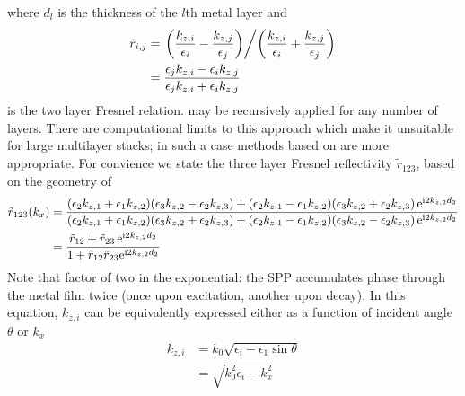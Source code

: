 \documentclass[a4paper,titlepage,onecolumn]{report}
\begin{document}
where $d_l$ is the thickness of the $l$th metal layer and 
\begin{align}
\tilde{r}_{i,j}&=
\left.\left(\frac{k_{z,i}}{\epsilon_i}-\frac{k_{z,j}}{\epsilon_j}\right)
\middle/
\left(\frac{k_{z,i}}{\epsilon_i}+\frac{k_{z,j}}{\epsilon_j}\right)\right.\\
&=\frac{\epsilon_j k_{z,i}-\epsilon_i k_{z,j}}
{\epsilon_j k_{z,i}+\epsilon_i k_{z,j}}
\end{align}
is the two layer Fresnel relation.   may be
recursively applied for any number of layers.  There are computational
limits to this approach which make it unsuitable for large multilayer
stacks; in such a case methods based on  are more
appropriate.  For convience we state the three layer Fresnel reflectivity
$\tilde{r}_{123}$, based on the geometry of 
\begin{align}
\tilde{r}_{123}(k_x) &=
\frac{
  (\epsilon_2 k_{z,1}+\epsilon_1 k_{z,2})(\epsilon_3 k_{z,2}-\epsilon_2 k_{z,3})
+ (\epsilon_2 k_{z,1}-\epsilon_1 k_{z,2})(\epsilon_3 k_{z,2}+\epsilon_2 k_{z,3})\,
{\mathrm{e}}^{{\mathrm{i}} 2 k_{z,2} d_2}
}
{
  (\epsilon_2 k_{z,1}+\epsilon_1 k_{z,2})(\epsilon_3 k_{z,2}+\epsilon_2 k_{z,3})
+ (\epsilon_2 k_{z,1}-\epsilon_1 k_{z,2})(\epsilon_3 k_{z,2}-\epsilon_2 k_{z,3})\,
{\mathrm{e}}^{{\mathrm{i}} 2 k_{z,2} d_2}
}\\
&=
\frac{\tilde{r}_{12}+\tilde{r}_{23}\, {\mathrm{e}}^{{\mathrm{i}} 2 k_{z,2} d_2}} {1+\tilde{r}_{12} \tilde{r}_{23} {\mathrm{e}}^{{\mathrm{i}} 2 k_{z,2} d_2}}
\label{eqn:fresnel123}
\end{align}
Note that factor of two in the exponential: the SPP accumulates phase
through the metal film twice (once upon excitation, another upon decay).
In this equation, $k_{z,i}$ can be equivalently expressed either as a
function of incident angle $\theta$ or $k_x$
\begin{align}
k_{z,i} &= k_0 \sqrt{\epsilon_i - \epsilon_1 \sin \theta}\\
&= \sqrt{k_0^2\epsilon_i - k_x^2}
\end{align}\begin{flushleft}\begin{center}\end{center}\end{flushleft}
\end{document}
